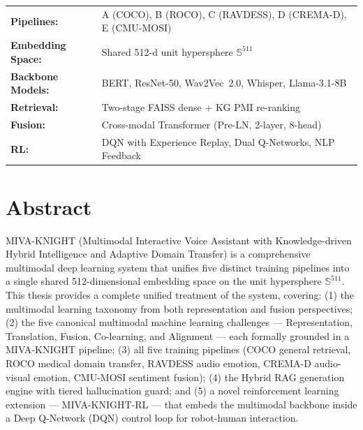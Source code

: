 \documentclass[12pt,a4paper]{article}
\theoremstyle{definition}
\theoremstyle{plain}
\theoremstyle{remark}
\newcommand{\Sph}{\mathbb{S}}
\begin{document}
\begin{titlepage}
\vfill
\begin{center}
\begin{tabular}{ll}
\textbf{Pipelines:} & A (COCO), B (ROCO), C (RAVDESS), D (CREMA-D), E (CMU-MOSI) \\
\textbf{Embedding Space:} & Shared 512-d unit hypersphere $\Sph^{511}$ \\
\textbf{Backbone Models:} & BERT, ResNet-50, Wav2Vec~2.0, Whisper, Llama-3.1-8B \\
\textbf{Retrieval:} & Two-stage FAISS dense + KG PMI re-ranking \\
\textbf{Fusion:} & Cross-modal Transformer (Pre-LN, 2-layer, 8-head) \\
\textbf{RL:} & DQN with Experience Replay, Dual Q-Networks, NLP Feedback \\
\end{tabular}
\end{center}
\vspace{1.5cm}
\end{titlepage}

\tableofcontents
\newpage

\section{Abstract}

MIVA-KNIGHT (Multimodal Interactive Voice Assistant with Knowledge-driven Hybrid Intelligence and Adaptive Domain Transfer) is a comprehensive multimodal deep learning system that unifies five distinct training pipelines into a single shared 512-dimensional embedding space on the unit hypersphere $\Sph^{511}$. This thesis provides a complete unified treatment of the system, covering: (1) the multimodal learning taxonomy from both representation and fusion perspectives; (2) the five canonical multimodal machine learning challenges — Representation, Translation, Fusion, Co-learning, and Alignment — each formally grounded in a MIVA-KNIGHT pipeline; (3) all five training pipelines (COCO general retrieval, ROCO medical domain transfer, RAVDESS audio emotion, CREMA-D audio-visual emotion, CMU-MOSI sentiment fusion); (4) the Hybrid RAG generation engine with tiered hallucination guard; and (5) a novel reinforcement learning extension — MIVA-KNIGHT-RL — that embeds the multimodal backbone inside a Deep Q-Network (DQN) control loop for robot-human interaction.
\end{document}
